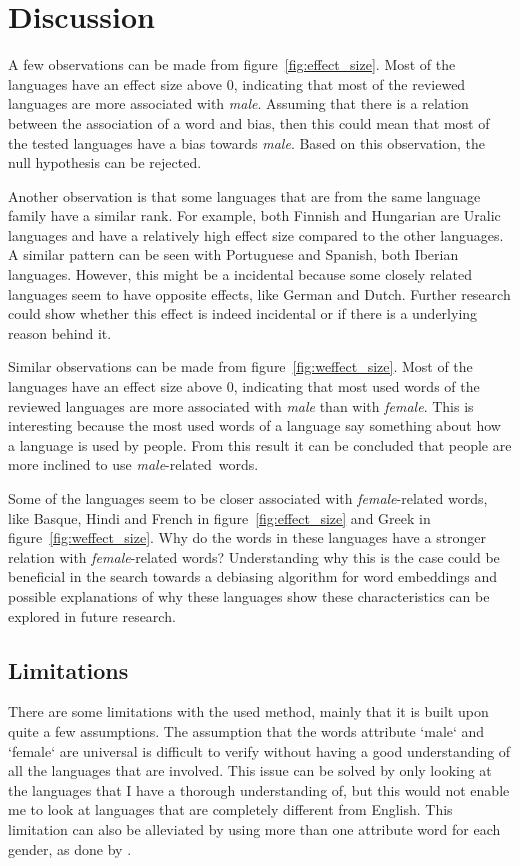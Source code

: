 \section{Discussion}
A few observations can be made from figure~\ref{fig:effect_size}. Most
of the languages have an effect size above 0, indicating that most of the reviewed
languages are more associated with \emph{male}. Assuming that there is a relation between
the association of a word and bias, then this could mean that
most of the tested languages have a bias towards \emph{male}. Based on this observation,
the null hypothesis can be rejected.

Another observation is that some languages that are from the same language family have
a similar rank. For example, both Finnish and Hungarian are Uralic languages and have a
relatively high effect size compared to the other languages. A similar pattern can be seen
with Portuguese and Spanish, both Iberian languages. However, this might be a incidental
because some closely related languages seem to have opposite effects, like German and
Dutch. Further research could show whether this effect is indeed incidental or if
there is a underlying reason behind it.

Similar observations can be made from figure~\ref{fig:weffect_size}. Most
of the languages have an effect size above 0, indicating that most used words of the
reviewed languages are more associated with \emph{male} than with \emph{female}. This
is interesting because the most used words of a language say something about how a
language is used by people.
From this result it can be concluded that people are more inclined to use
\mbox{\emph{male}-related words}.

Some of the languages seem to be closer associated with \emph{female}-related words, like
Basque, Hindi and French in figure~\ref{fig:effect_size} and Greek in
figure~\ref{fig:weffect_size}. Why do the words in these languages have a stronger
relation with \emph{female}-related words?
Understanding why this is
the case could be beneficial in the search towards a debiasing algorithm for word
embeddings and possible explanations of why these languages show these characteristics can
be explored in future research.


\subsection{Limitations}
There are some limitations with the used method, mainly that it is built upon quite a few
assumptions.
The assumption that the words attribute `male` and `female` are universal is difficult
to verify without having a good understanding of all the languages that are involved.
This issue can be solved by only looking at the languages that I have a thorough
understanding of, but this would not enable me to look at languages that are completely
different from English. This limitation can also be alleviated by using more than one
attribute word for each gender, as done by \textcite{caliskan_2017_semantics_language_corpora}.

